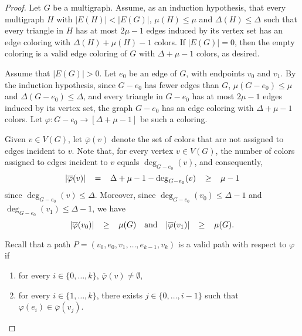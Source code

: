 \begin{proof}
    Let \(G\) be a multigraph.
    Assume, as an induction hypothesis,
    that every multigraph \(H\) with \(|E(H)| < |E(G)|\),
    \(\mu(H) \leq \mu\) and \(\Delta(H) \leq \Delta\)
    such that every triangle in \(H\) has at most \(2\mu - 1\) edges induced by its vertex set
    has an edge coloring with \(\Delta(H) + \mu(H) - 1\) colors.
    If \(|E(G)| = 0\),
    then the empty coloring is a valid edge coloring of \(G\)
    with \(\Delta + \mu - 1\) colors,
    as desired.

    Assume that \(|E(G)| > 0\).
    Let \(e_0\) be an edge of \(G\),
    with endpoints \(v_0\) and \(v_1\).
    By the induction hypothesis,
    since \(G - e_0\) has fewer edges than \(G\),
    \(\mu(G - e_0) \leq \mu\) and \(\Delta(G - e_0) \leq \Delta\),
    and every triangle in \(G - e_0\) has at most \(2\mu - 1\) edges induced by its vertex set,
    the graph \(G - e_0\) has an edge coloring
    with \(\Delta + \mu - 1\) colors.
    Let \(\varphi \colon G - e_0 \to [\Delta + \mu - 1]\)
    be such a coloring.

    Given \(v \in V(G)\),
    let \(\overline\varphi(v)\) denote the
    set of colors that are not assigned to edges incident to \(v\).
    Note that,
    for every vertex \(v \in V(G)\),
    the number of colors assigned to edges incident to \(v\)
    equals \(\deg_{G - e_0}(v)\),
    and consequently,
    \begin{equation} \label{eq:overline-phi-v-mu-again}
        \thickmuskip=20mu
        |\overline\varphi(v)| = \Delta + \mu - 1 - \deg_{G - e_0}(v) \geq \mu - 1
    \end{equation}
    since \(\deg_{G - e_0}(v) \leq \Delta\).
    Moreover, since \(\deg_{G - e_0}(v_0) \leq \Delta - 1\)
    and \(\deg_{G - e_0}(v_1) \leq \Delta - 1\),
    we have
    \begin{equation} \label{eq:overline-phi-v0-v1-mu-again}
        \thickmuskip=20mu
        |\overline\varphi(v_0)|  \geq \mu(G)
        \quad \text{and} \quad
        |\overline\varphi(v_1)|  \geq \mu(G).
    \end{equation}

    Recall that a path \(P = (v_0, e_0, v_1, \dots, e_{k-1}, v_k)\)
    is a valid path with respect to \(\varphi\) if
    \begin{enumerate}[itemsep=0pt, topsep=0pt]
        \item for every \(i \in \{0, \dots, k\}\),
            \(\overline\varphi(v) \neq \emptyset\), \label{item:valid-path-missing-color-again}
        \item for every \(i \in \{1, \dots, k\}\),
            there exists \(j \in \{0, \dots, i-1\}\)
            such that \(\varphi(e_i) \in \overline\varphi(v_j)\). \label{item:valid-path-color-misses-before-again}
    \end{enumerate}


\end{proof}
